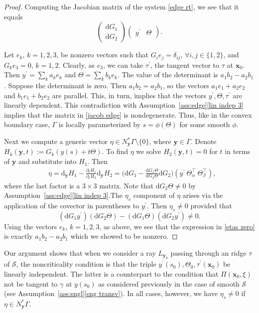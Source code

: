 \documentclass[11pt]{article}
\newcommand{\be}{\begin{equation}}
\newcommand{\ee}{\end{equation}}
\newcommand{\s}{\mathcal S}
\newcommand{\ed}{\tau}
\newcommand{\pa}{\partial}
\newcommand{\bt}{\beta}
\newcommand{\al}{\alpha}
\newcommand{\dd}{\mathrm{d}}
\newcommand{\ga}{\gamma}
\newcommand{\de}{\delta}
\numberwithin{equation}{section}
\newcommand{\vy}{\mathbf{y}}
\newcommand{\vx}{\mathbf{x}}
\theoremstyle{definition}
\begin{document}
\begin{proof}
Computing the Jacobian matrix of the system \eqref{edge rt}, we see that it equals
\be\label{jacob edge}
\begin{pmatrix} \dd G_1 \\ \dd G_2\end{pmatrix}\begin{pmatrix} y^\prime & \Theta \end{pmatrix}.
\ee

Let $e_k$, $k=1,2,3$, be nonzero vectors such that $G_ie_j=\de_{ij}$, $\forall i,j\in\{1,2\}$, and $G_ke_3=0$, $k=1,2$. Clearly, as $e_3$, we can take $\ed^\prime$, the tangent vector to $\ed$ at $\vx_0$. Then $y^\prime=\sum_k a_ke_k$ and $\Theta=\sum_k b_ke_k$. The value of the determinant is 
$a_1b_2-a_2b_1$. Suppose the determinant is zero. Then $a_1b_2=a_2b_1$, so the vectors $a_1e_1+a_2e_2$ and $b_1e_1+b_2e_2$ are parallel. This, in turn, implies that the vectors $y^\prime,\Theta,\ed^\prime$ are linearly dependent. This contradiction with Assumption~\ref{ass:edge}\eqref{lin indep 3} implies that the matrix in \eqref{jacob edge} is nondegenerate. Thus, like in the convex boundary case, $\Gamma$ is locally parameterized by $s=\phi(\Theta)$ for some smooth $\phi$.

Next we compute a generic vector $\eta\in N_{\vy}^*\Gamma\setminus\{0\}$, where $\vy\in\Gamma$. Denote $H_k(\vy,t):=G_k(y(s)+t\Theta)$. To find $\eta$ we solve $H_2(\vy,t)=0$ for $t$ in terms of $\vy$ and substitute into $H_1$. Then
\be\label{eta edge}\begin{split}
&\eta=\dd_{\vy}H_1-\frac{\pa_t H_1}{\pa_t H_2}\dd_{\vy} H_2=\Big(\dd G_1-\frac{\dd G_1\Theta}{\dd G_2\Theta}\dd G_2\Big)(y^\prime\ \Theta_\al^\top\ \Theta_\bt^\top),
\end{split}
\ee
where the last factor is a $3\times 3$ matrix. Note that $\dd G_2\Theta\neq0$ by Assumption~\ref{ass:edge}\eqref{lin indep 3}.The $\eta_s$ component of $\eta$ arises via the application of the covector in parentheses to $y^\prime$. Then $\eta_s\neq0$ provided that
\be\label{etas zero}
(\dd G_1 y^\prime)(\dd G_2\Theta)-(\dd G_1\Theta)(\dd G_2y^\prime)\not=0.
\ee
Using the vectors $e_k$, $k=1,2,3$, as above, we see that the expression in \eqref{etas zero} is exactly $a_1b_2-a_2b_1$ which we showed to be nonzero.  
\end{proof}

Our argument shows that when we consider a ray $L_{\vy_0}$ passing through an ridge $\ed$ of $\s$, the noncriticality condition is that the triple $y^\prime(s_0),\Theta_0,\ed^\prime(\vx_0)$ be linearly independent. The latter is a counterpart to the condition that $\Pi(\vx_0,\xi)$ not be tangent to $\ga$ at $y(s_0)$ as considered previously in the case of smooth $\s$ (see Assumption~\ref{ass:sngl}\eqref{sng transv}). In all cases, however, we have $\eta_s\not=0$ if $\eta\in N_{\vy}^*\Gamma$.
\end{document}
